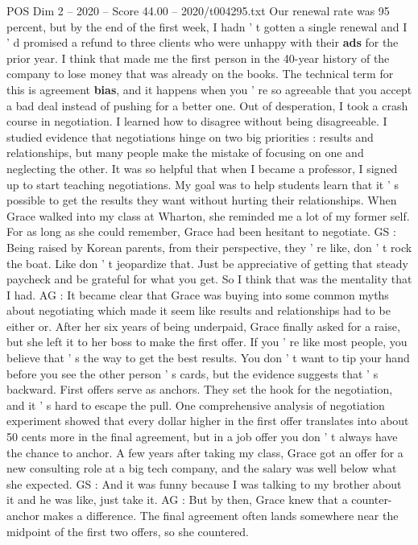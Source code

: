 \begin{textsample}{POS Dim 2 – 2020 – Score 44.00 – 2020/t004295.txt}
Our renewal rate was 95 percent, but by the end of the first week, I hadn ' t gotten a single renewal and I ' d promised a refund to three clients who were unhappy with their \textbf{ads} for the prior year.
I think that made me the first person in the 40-year history of the company to lose money that was already on the books.
The technical term for this is agreement \textbf{bias}, and it happens when you ' re so agreeable that you accept a bad deal instead of pushing for a better one.
Out of desperation, I took a crash course in negotiation.
I learned how to disagree without being disagreeable.
I studied evidence that negotiations hinge on two big priorities : results and relationships, but many people make the mistake of focusing on one and neglecting the other.
It was so helpful that when I became a professor, I signed up to start teaching negotiations.
My goal was to help students learn that it ' s possible to get the results they want without hurting their relationships.
When Grace walked into my class at Wharton, she reminded me a lot of my former self.
For as long as she could remember, Grace had been hesitant to negotiate.
GS : Being raised by Korean parents, from their perspective, they ' re like, don ' t rock the boat.
Like don ' t jeopardize that.
Just be appreciative of getting that steady paycheck and be grateful for what you get.
So I think that was the mentality that I had.
AG : It became clear that Grace was buying into some common myths about negotiating which made it seem like results and relationships had to be either or.
After her six years of being underpaid, Grace finally asked for a raise, but she left it to her boss to make the first offer.
If you ' re like most people, you believe that ' s the way to get the best results.
You don ' t want to tip your hand before you see the other person ' s cards, but the evidence suggests that ' s backward.
First offers serve as anchors.
They set the hook for the negotiation, and it ' s hard to escape the pull.
One comprehensive analysis of negotiation experiment showed that every dollar higher in the first offer translates into about 50 cents more in the final agreement, but in a job offer you don ' t always have the chance to anchor.
A few years after taking my class, Grace got an offer for a new consulting role at a big tech company, and the salary was well below what she expected.
GS : And it was funny because I was talking to my brother about it and he was like, just take it.
AG : But by then, Grace knew that a counter-anchor makes a difference.
The final agreement often lands somewhere near the midpoint of the first two offers, so she countered.

\end{textsample}
